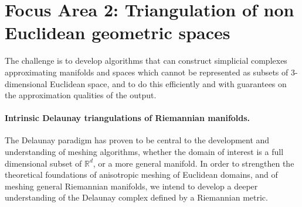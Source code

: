 %

\newcommand{\man}{\mathcal{M}}
\newcommand{\reel}{\mathbb{R}}
\newcommand{\rdee}{\reel^d}
\renewcommand{\pts}{P}
\newcommand{\mesh}{\hat{M}}

\newcommand{\ramsay}[1]{\framebox{#1}}%

\section*{Focus Area 2: Triangulation of non Euclidean geometric spaces}

The challenge is to develop algorithms that can construct simplicial
complexes approximating manifolds and spaces which cannot be
represented as subsets of 3-dimensional Euclidean space, and to do
this efficiently and with guarantees on the approximation qualities of
the output. %

\paragraph{Intrinsic Delaunay triangulations of Riemannian manifolds.}

The Delaunay paradigm has proven to be central to the development and
understanding of meshing algorithms, whether the domain of interest is
a full dimensional subset of $\rdee$, or a more general manifold. In
order to strengthen the theoretical foundations of anisotropic meshing of
Euclidean domains, and of meshing general Riemannian manifolds, we
intend to develop a deeper understanding of the
Delaunay complex defined by a Riemannian metric.
%

